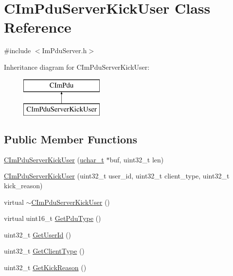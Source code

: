 \hypertarget{class_c_im_pdu_server_kick_user}{}\section{C\+Im\+Pdu\+Server\+Kick\+User Class Reference}
\label{class_c_im_pdu_server_kick_user}


{\ttfamily \#include $<$Im\+Pdu\+Server.\+h$>$}

Inheritance diagram for C\+Im\+Pdu\+Server\+Kick\+User\+:\begin{figure}[H]
\begin{center}
\leavevmode
\includegraphics[height=2.000000cm]{class_c_im_pdu_server_kick_user}
\end{center}
\end{figure}
\subsection*{Public Member Functions}
\begin{DoxyCompactItemize}
\item 
\hyperlink{class_c_im_pdu_server_kick_user_a04a2de6000b70f4d163a4c329fbb9747}{C\+Im\+Pdu\+Server\+Kick\+User} (\hyperlink{base_2ostype_8h_a124ea0f8f4a23a0a286b5582137f0b8d}{uchar\+\_\+t} $\ast$buf, uint32\+\_\+t len)
\item 
\hyperlink{class_c_im_pdu_server_kick_user_a1fa17d152a6caafffa93e524010690ab}{C\+Im\+Pdu\+Server\+Kick\+User} (uint32\+\_\+t user\+\_\+id, uint32\+\_\+t client\+\_\+type, uint32\+\_\+t kick\+\_\+reason)
\item 
virtual \hyperlink{class_c_im_pdu_server_kick_user_a905445f715b828d62377b4d13009b889}{$\sim$\+C\+Im\+Pdu\+Server\+Kick\+User} ()
\item 
virtual uint16\+\_\+t \hyperlink{class_c_im_pdu_server_kick_user_af579b005c3c0882b4d3e4f9aa2f91244}{Get\+Pdu\+Type} ()
\item 
uint32\+\_\+t \hyperlink{class_c_im_pdu_server_kick_user_a46320df502bb68c5a31b3da408ed9ffc}{Get\+User\+Id} ()
\item 
uint32\+\_\+t \hyperlink{class_c_im_pdu_server_kick_user_a3bc6329684d6732dfc90adeb6532a591}{Get\+Client\+Type} ()
\item 
uint32\+\_\+t \hyperlink{class_c_im_pdu_server_kick_user_a29c1a89b68cccb003fd5a4922eda772d}{Get\+Kick\+Reason} ()
\end{DoxyCompactItemize}
